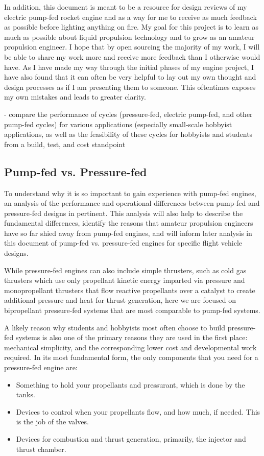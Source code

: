 \documentclass[12pt, letterpaper]{article}
\begin{document}
In addition, this document is meant to be a resource for design reviews of my electric pump-fed rocket engine and as a way for me to receive as much feedback as possible before lighting anything on fire. My goal for this project is to learn as much as possible about liquid propulsion technology and to grow as an amateur propulsion engineer. I hope that by open sourcing the majority of my work, I will be able to share my work more and receive more feedback than I otherwise would have. As I have made my way through the initial phases of my engine project, I have also found that it can often be very helpful to lay out my own thought and design processes as if I am presenting them to someone. This oftentimes exposes my own mistakes and leads to greater clarity.

- compare the performance of cycles (pressure-fed, electric pump-fed, and other pump-fed cycles) for various applications (especially small-scale hobbyist applications, as well as the feasibility of these cycles for hobbyists and students from a build, test, and cost standpoint

\subsection{Pump-fed vs. Pressure-fed}

To understand why it is so important to gain experience with pump-fed engines, an analysis of the performance and operational differences between pump-fed and pressure-fed designs in pertinent. This analysis will also help to describe the fundamental differences, identify the reasons that amateur propulsion engineers have so far shied away from pump-fed engines, and will inform later analysis in this document of pump-fed vs. pressure-fed engines for specific flight vehicle designs.

While pressure-fed engines can also include simple thrusters, such as cold gas thrusters which use only propellant kinetic energy imparted via pressure and monopropellant thrusters that flow reactive propellants over a catalyst to create additional pressure and heat for thrust generation, here we are focused on bipropellant pressure-fed systems that are most comparable to pump-fed systems.

A likely reason why students and hobbyists most often choose to build pressure-fed systems is also one of the primary reasons they are used in the first place: mechanical simplicity, and the corresponding lower cost and developmental work required. In its most fundamental form, the only components that you need for a pressure-fed engine are:
\begin{itemize}
    \item Something to hold your propellants and pressurant, which is done by the tanks.
    \item Devices to control when your propellants flow, and how much, if needed. This is the job of the valves.
    \item Devices for combustion and thrust generation, primarily, the injector and thrust chamber.
\end{itemize}
\end{document}
